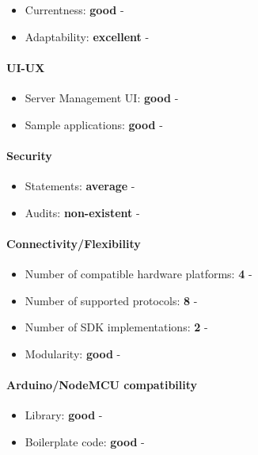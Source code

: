 \documentclass{article}
\begin{document}
\begin{itemize}
\item Currentness: \textbf{good} - 
\item Adaptability: \textbf{excellent} - 
\end{itemize}

\paragraph{UI-UX}

\begin{itemize}
\item Server Management UI: \textbf{good} - 
\item Sample applications: \textbf{good} - 
\end{itemize}

\paragraph{Security} 

\begin{itemize}
\item Statements: \textbf{average} - 
\item Audits: \textbf{non-existent} - 
\end{itemize}

\paragraph{Connectivity/Flexibility}

\begin{itemize}
\item Number of compatible hardware platforms: \textbf{4} - 
\item Number of supported protocols: \textbf{8} - 
\item Number of SDK implementations: \textbf{2} - 
\item Modularity: \textbf{good} - 
\end{itemize}

\paragraph{Arduino/NodeMCU compatibility}

\begin{itemize}
\item Library: \textbf{good} - 
\item Boilerplate code: \textbf{good} - 
\end{itemize}
\end{document}
